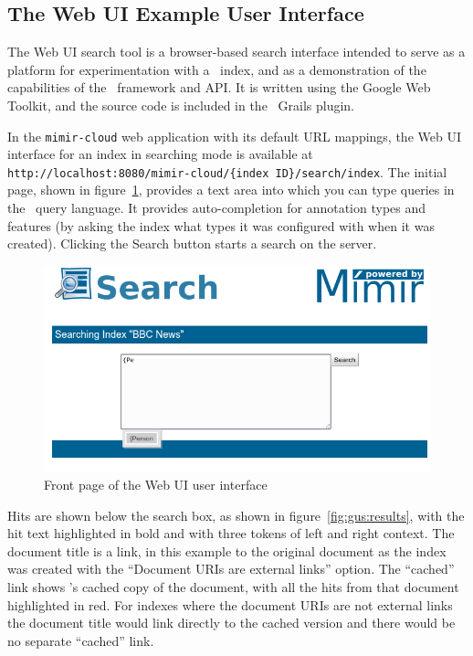 \subsection{The Web UI Example User Interface}\label{sec:search:gus}

The Web UI search tool is a browser-based search interface intended to serve as
a platform for experimentation with a \Mimir\ index, and as a demonstration of
the capabilities of the \Mimir\ framework and API.  It is written using the
Google Web Toolkit, and the source code is included in the \Mimir\ Grails
plugin.

In the {\tt mimir-cloud} web application with its default URL mappings, the Web
UI interface for an index in searching mode is available at\\
\verb!http://localhost:8080/mimir-cloud/{index ID}/search/index!.  The initial
page, shown in figure~\ref{fig:gus:front-page}, provides a text area into which
you can type queries in the \Mimir\ query language.  It provides auto-completion
for annotation types and features (by asking the index what types it was
configured with when it was created). Clicking the Search button starts a search
on the server.

\begin{figure}[tbp]
\begin{center}
\includegraphics[scale=0.5]{img/web-ui-frontpage}
\caption{Front page of the Web UI user interface}
\label{fig:gus:front-page}
\end{center}
\end{figure}

Hits are shown below the search box, as shown in figure~\ref{fig:gus:results},
with the hit text highlighted in bold and with three tokens of left and right
context.  The document title is a link, in this example to the original
document as the index was created with the ``Document URIs are external links''
option.  The ``cached'' link shows \Mimir's cached copy of the document, with
all the hits from that document highlighted in red.  For indexes where the
document URIs are not external links the document title would link directly to
the cached version and there would be no separate ``cached'' link.

